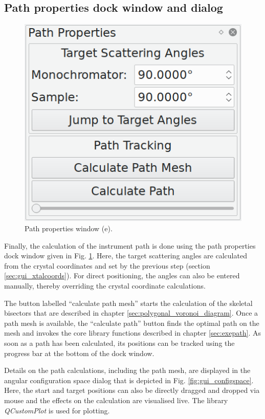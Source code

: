 \subsection{Path properties dock window and dialog}
\begin{minipage}{1 \textwidth}
\setlength{\intextsep}{0.25cm}
\begin{figure}
	\vspace{-0.25cm}
	\includegraphics[width = 0.25 \textwidth]{figures/gui_path}
	\caption[Path properties window.]{Path properties window (e).
		\label{fig:gui_path}}
\end{figure}

Finally, the calculation of the instrument path is done using the path properties dock window
given in Fig. \ref{fig:gui_path}. Here, the target scattering angles are calculated from the crystal
coordinates and set by the previous step (section \ref{sec:gui_xtalcoords}). For direct positioning,
the angles can also be entered manually, thereby overriding the crystal coordinate calculations.

The button labelled ``calculate path mesh'' starts the calculation of the skeletal bisectors that are
described in chapter \ref{sec:polygonal_voronoi_diagram}.
Once a path mesh is available, the ``calculate path'' button finds the optimal path on the mesh and 
invokes the core library functions described in chapter \ref{sec:exepath}.
As soon as a path has been calculated, its positions can be tracked using the progress bar at the bottom
of the dock window.

Details on the path calculations, including the path mesh, are displayed in the angular configuration
space dialog that is depicted in Fig. \ref{fig:gui_configspace}.
Here, the start and target positions can also be directly dragged and dropped via mouse and the
effects on the calculation are visualised live.
The library \textit{QCustomPlot} \cite{web_QCustomPlot} is used for plotting.

\end{minipage}



